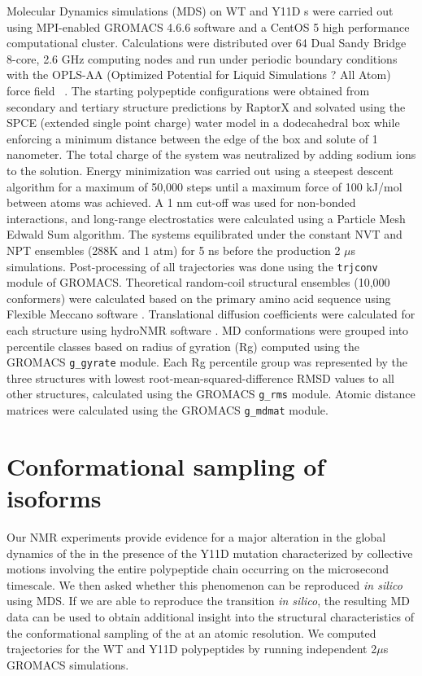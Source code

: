 Molecular Dynamics simulations (MDS) on WT and Y11D \gct{}s were carried out using MPI-enabled GROMACS 4.6.6 software\cite{hess2008gromacs} and a CentOS 5 high performance computational cluster. Calculations were distributed over 64 Dual Sandy Bridge 8-core, 2.6 GHz computing nodes and run under periodic boundary conditions with the OPLS-AA (Optimized Potential for Liquid Simulations ? All Atom) force field ~\cite{kaminski2001evaluation}.  The starting \gct{} polypeptide configurations were obtained from secondary and tertiary structure predictions by RaptorX \cite{kallberg2012template} and solvated using the SPCE (extended single point charge) water model in a dodecahedral box while enforcing a minimum distance between the edge of the box and solute of 1 nanometer. The total charge of the system was neutralized by adding sodium ions to the solution. Energy minimization was carried out using a steepest descent algorithm for a maximum of 50,000 steps until a maximum force of 100 kJ/mol between atoms was achieved. A 1 nm cut-off was used for non-bonded interactions, and long-range electrostatics were calculated using a Particle Mesh Edwald Sum algorithm. The systems equilibrated under the constant NVT and NPT ensembles (288K and 1 atm) for 5 ns before the production 2 $\mu$s simulations. Post-processing of all trajectories was done using the \texttt{trjconv} module of GROMACS. Theoretical random-coil structural ensembles (10,000 conformers) were calculated based on the \gct{} primary amino acid sequence using Flexible Meccano software \cite{ozenne2012flexible}. Translational diffusion coefficients were calculated for each structure using hydroNMR software \cite{de2000hydronmr}. 
MD conformations were grouped into percentile classes based on radius of gyration (Rg) computed using the GROMACS \texttt{g\_gyrate} module. Each Rg percentile group was represented by the three structures with lowest root-mean-squared-difference RMSD values to all other structures, calculated using the GROMACS \texttt{g\_rms} module. Atomic distance matrices were calculated using the GROMACS \texttt{g\_mdmat} module.

\section{Conformational sampling of \gct{} isoforms}

Our NMR experiments provide evidence for a major alteration in the global dynamics of the \gct{} in the presence of the Y11D mutation characterized by collective motions involving the entire polypeptide chain occurring on the microsecond timescale. We then asked whether this phenomenon can be reproduced \textit{in silico} using MDS.  If we are able to reproduce the transition \textit{in silico}, the resulting MD data can be used to obtain additional insight into the structural characteristics of the conformational sampling of the \gct{} at an atomic resolution. We computed trajectories for the WT and Y11D \gct{} polypeptides by running independent 2$\mu$s GROMACS simulations.

